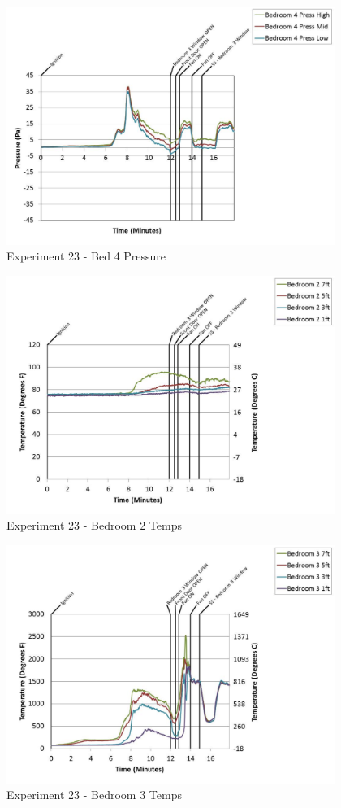 \documentclass{article}
\begin{document}
\begin{appendices}
	\begin{figure}[h!]
		\centering
		\includegraphics[height=3.05in]{0_Images/Results_Charts/Exp_23_Charts/Bed4Pressure.pdf}
		\caption{Experiment 23 - Bed 4 Pressure}
	\end{figure}
 
	\clearpage

	\begin{figure}[h!]
		\centering
		\includegraphics[height=3.05in]{0_Images/Results_Charts/Exp_23_Charts/Bedroom2Temps.pdf}
		\caption{Experiment 23 - Bedroom 2 Temps}
	\end{figure}
 

	\begin{figure}[h!]
		\centering
		\includegraphics[height=3.05in]{0_Images/Results_Charts/Exp_23_Charts/Bedroom3Temps.pdf}
		\caption{Experiment 23 - Bedroom 3 Temps}
	\end{figure}
 

\end{appendices}
\end{document}
